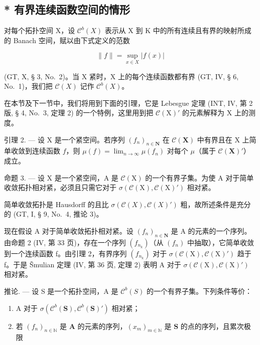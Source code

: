 \subsection{* 有界连续函数空间的情形}

对每个拓扑空间 X，设 \(\mathcal{C}^{b}(X)\) 表示从 X 到 K 中的所有连续且有界的映射所成的 Banach 空间，赋以由下式定义的范数

\[
\| f \| = \sup _ {x \in X} | f (x) |\tag{6}
\]

(GT, X, § 3, No.~2)。当 X 紧时，X 上的每个连续函数都有界 (GT, IV, § 6, No.~1)，我们把 \(\mathcal{C}(X)\) 记作 \(\mathcal{C}^b(X)\)。

在本节及下一节中，我们将用到下面的引理，它是 Lebesgue 定理 (INT, IV, 第 2 版, § 4, No.~3, 定理 2) 的一个特例，这里用到把 \(\mathcal{C}(\mathrm{X})'\) 的元素解释为 X 上的测度。

引理 2. --- 设 X 是一个紧空间。若序列 \((f_n)_{n\in \mathbf{N}}\) 在 \(\mathcal{C}(\mathbf{X})\) 中有界且在 X 上简单收敛到连续函数 \(f\)，则 \(\mu(f) = \lim_{n\to \infty}\mu(f_n)\) 对每个 \(\mu\)（属于 \(\mathcal{C}(\mathbf{X})'\)）成立。

命题 3. --- 设 X 是一个紧空间，A 是 \(\mathcal{C}(\mathrm{X})\) 的一个有界子集。为使 A 对于简单收敛拓扑相对紧，必须且只需它对于 \(\sigma(\mathcal{C}(\mathrm{X}), \mathcal{C}(\mathrm{X})')\) 相对紧。

简单收敛拓扑是 Hausdorff 的且比 \(\sigma(\mathcal{C}(X), \mathcal{C}(X)')\) 粗，故所述条件是充分的 (GT, I, § 9, No.~4, 推论 3)。

现在假设 A 对于简单收敛拓扑相对紧。设 \((f_{n})_{n\in\mathbf{N}}\) 是 A 的元素的一个序列。由命题 2 (IV, 第 33 页)，存在一个序列 \((f_{n_{k}})\)（从 \((f_{n})\) 中抽取），它简单收敛到一个连续函数 f。由引理 2，有界序列 \((f_{n_{k}})\) 对于 \(\sigma(\mathcal{C}(\mathrm{X}),\mathcal{C}(\mathrm{X})')\) 趋于 f。于是 Šmulian 定理 (IV, 第 36 页, 定理 2) 表明 A 对于 \(\sigma(\mathcal{C}(\mathrm{X}),\mathcal{C}(\mathrm{X})')\) 相对紧。

推论. --- 设 S 是一个拓扑空间，A 是 \(\mathcal{C}^{b}(S)\) 的一个有界子集。下列条件等价：

\begin{enumerate}
\def\labelenumi{(\roman{enumi})}
\item
  A 对于 \(\sigma(\mathcal{C}^b(\mathbf{S}),\mathcal{C}^b(\mathbf{S})')\) 相对紧；
\item
  若 \((f_n)_{n\in \mathbb{N}}\) 是 \(\mathbf{A}\) 的元素的序列，\((x_m)_{m\in \mathbb{N}}\) 是 \(\mathbf{S}\) 的点的序列，且累次极限
\end{enumerate}

